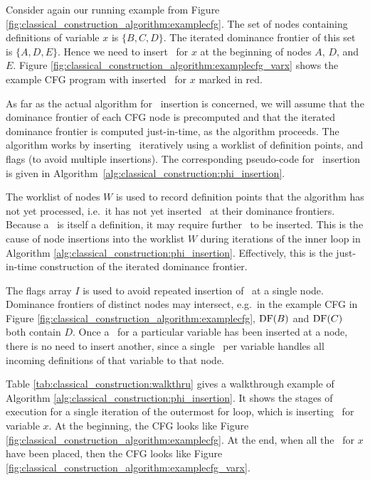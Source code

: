 Consider again our running example from Figure 
\ref{fig:classical_construction_algorithm:examplecfg}. The set of nodes containing definitions
of variable
$x$ is $\{ B,C,D \}$. The iterated dominance frontier of this set
is $\{ A, D, E \}$. Hence we need to insert 
\phiops\ for $x$ at the beginning of nodes $A$, $D$, and $E$.
Figure \ref{fig:classical_construction_algorithm:examplecfg_varx} shows the example CFG program
with inserted \phiops\ for $x$ marked in red.



As far as the actual algorithm for \phiops\ insertion
is concerned, we will assume that the dominance
frontier of each CFG node is precomputed and that the iterated dominance frontier is computed just-in-time, as the algorithm proceeds.
The algorithm works by inserting \phiops\ iteratively
using a worklist of definition points, and flags (to avoid multiple
insertions). The corresponding pseudo-code for
\phiop\ insertion is given in
Algorithm~\ref{alg:classical_construction:phi_insertion}.


The worklist of nodes $W$ is used to record definition points that the
algorithm
has not yet processed, i.e.\ it has not yet inserted \phiops\ at their dominance
frontiers.
Because a \phiop\ is itself a 
definition, it may require further \phiops\ to be inserted.
This is the cause of node insertions into the worklist $W$ during
iterations of the inner loop in Algorithm 
\ref{alg:classical_construction:phi_insertion}.
Effectively, this is the just-in-time construction of
the iterated dominance frontier.


The flags array $I$ is used to avoid repeated insertion of \phiops\
at a single node. Dominance
frontiers
of distinct nodes may intersect, e.g.\ in the example CFG in Figure
\ref{fig:classical_construction_algorithm:examplecfg},
$\mathrm{DF}(B)$ and $\mathrm{DF}(C)$ both contain $D$. 
Once a \phiop\ for a particular variable has been
inserted at a node,
there is no need to insert another, since a single \phiop\ per
variable handles all incoming definitions of that variable to that node.

Table \ref{tab:classical_construction:walkthru} 
gives a walkthrough example of Algorithm 
\ref{alg:classical_construction:phi_insertion}.
It shows the stages of execution for a single iteration of
the outermost for loop, which is inserting \phiops\
for variable $x$.
At the beginning, the CFG looks like Figure \ref{fig:classical_construction_algorithm:examplecfg}.
At the end, when all the \phiops\ for $x$ have
been placed, then the CFG looks like Figure \ref{fig:classical_construction_algorithm:examplecfg_varx}.

